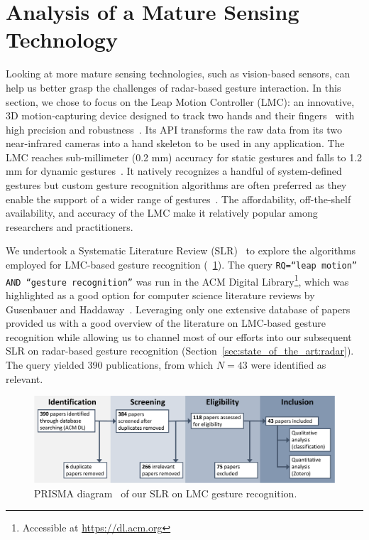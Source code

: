 \section{Analysis of a Mature Sensing Technology} \label{sec:state_of_the_art:lmc}
Looking at more mature sensing technologies, such as vision-based sensors, can help us better grasp the challenges of radar-based gesture interaction.
%
In this section, we chose to focus on the Leap Motion Controller (LMC): an innovative, 3D motion-capturing device designed to track two hands and their fingers~\cite{Togootogtokh:2018} with high precision and robustness~\cite{Weichert:2013}. Its API transforms the raw data from its two near-infrared cameras into a hand skeleton to be used in any application. The LMC reaches sub-millimeter (0.2 mm) accuracy for static gestures and falls to 1.2 mm for dynamic gestures~\cite{Weichert:2013}. It natively recognizes a handful of system-defined gestures but custom gesture recognition algorithms are often preferred as they enable the support of a wider range of gestures~\cite{Brandon:2014}.
The affordability, off-the-shelf availability, and accuracy of the LMC make it relatively popular among researchers and practitioners.

We undertook a Systematic Literature Review (SLR)~\cite{Kitchenham:2010} to explore the algorithms employed for LMC-based gesture recognition (\fig~\ref{fig:state_of_the_art:lmc:prisma}). 
%
The query \texttt{RQ=``leap motion'' AND ``gesture recognition''} was run in the ACM Digital Library\footnote{Accessible at \url{https://dl.acm.org}}, which was highlighted as a good option for computer science literature reviews by Gusenbauer and Haddaway~\cite{Gusenbauer:2020}. Leveraging only one extensive database of papers provided us with a good overview of the literature on LMC-based gesture recognition while allowing us to channel most of our efforts into our subsequent SLR on radar-based gesture recognition (Section~\ref{sec:state_of_the_art:radar}).
%
The query yielded 390 publications, from which $N{=}43$ were identified as relevant. 

\begin{figure}[htb]
    \centering
    \includegraphics[width=\linewidth]{Figures/StateOfTheArt/LMC/PRISMA-LMC.pdf}
    \vspace{-18pt}
    \caption{PRISMA diagram~\cite{Page:2021} of our SLR on LMC gesture recognition.}
    \label{fig:state_of_the_art:lmc:prisma}
    \vspace{-8pt}
\end{figure}

